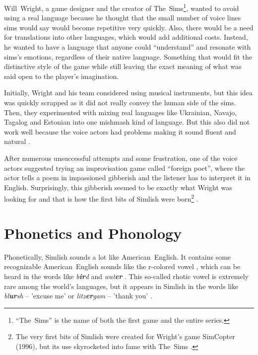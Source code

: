 \documentclass[11pt]{article}
\begin{document}
Will~Wright, a game designer and the creator of The~Sims\footnote{``The~Sims'' is the name of both the first game and the entire series.}, wanted to avoid using a real language because he thought that the small number of voice lines sims would say would become repetitive very quickly. Also, there would be a need for translations into other languages, which would add additional costs. Instead, he wanted to have a language that anyone could ``understand'' and resonate with sims's emotions, regardless of their native language. Something that would fit the distinctive style of the game while still leaving the exact meaning of what was said open to the player's imagination.

Initially, Wright and his team considered using musical instruments, but this idea was quickly scrapped as it did not really convey the human side of the sims. Then, they experimented with mixing real languages like Ukrainian, Navajo, Tagalog and Estonian into one mishmash kind of language. But this also did not work well because the voice actors had problems making it sound fluent and natural \cite{adams2011elvish, barnes2020sims}.

After numerous unsuccessful attempts and some frustration, one of the voice actors suggested trying an improvisation game called ``foreign poet'', where the actor tells a poem in impassioned gibberish and the listener has to interpret it in English. Surprisingly, this gibberish seemed to be exactly what Wright was looking for and that is how the first bits of Simlish were born\footnote{The very first bits of Simlish were created for Wright's game SimCopter (1996), but its use skyrocketed into fame with The~Sims \cite{bracchi2023invented}.} \cite{kilbane2020history}.

\section*{Phonetics and Phonology}

Phonetically, Simlish sounds a lot like American~English. It contains some recognizable American~English sounds like the r-colored vowel \textipa{/\textrhookschwa/}, %
which can be heard in the words like \textit{b\textbf{ir}d}  %
and \textit{wat\textbf{er}} . %
This so-called rhotic vowel is extremely rare among the world's languages, but it appears in Simlish in the words like \textit{bl\textbf{ur}sh}  %
-- 'excuse me' or \textit{litz\textbf{er}gam}  %
-- 'thank you' \cite{kirce2024language}.
\end{document}
